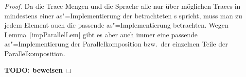 \begin{proof}
  Da die Trace-Mengen und die Sprache alle nur über möglichen Traces in
  mindestens einer as"=Implementierung der betrachteten \MEIO{}s spricht, muss
  man zu jedem Element auch die passende as"=Implementierung betrachten. Wegen
  Lemma~\ref{impParallelLem} gibt es aber auch immer eine passende
  as"=Implementierung der Parallelkomposition bzw.\ der einzelnen Teile der
  Parallelkomposition.

  \textbf{TODO: beweisen}



\end{proof}
